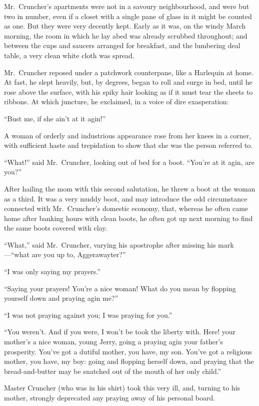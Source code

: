 Mr.\ Cruncher's apartments were not in a savoury neighbourhood, and
were but two in number, even if a closet with a single pane of glass
in it might be counted as one.  But they were very decently kept.
Early as it was, on the windy March morning, the room in which he lay
abed was already scrubbed throughout; and between the cups and
saucers arranged for breakfast, and the lumbering deal table, a very
clean white cloth was spread.

Mr.\ Cruncher reposed under a patchwork counterpane, like a Harlequin
at home.  At fast, he slept heavily, but, by degrees, began to roll
and surge in bed, until he rose above the surface, with his spiky
hair looking as if it must tear the sheets to ribbons.  At which
juncture, he exclaimed, in a voice of dire exasperation:

``Bust me, if she ain't at it agin!''

A woman of orderly and industrious appearance rose from her knees in
a corner, with sufficient haste and trepidation to show that she was
the person referred to.

``What!'' said Mr.\ Cruncher, looking out of bed for a boot.  ``You're at
it agin, are you?''

After hailing the mom with this second salutation, he threw a boot at
the woman as a third.  It was a very muddy boot, and may introduce
the odd circumstance connected with Mr.\ Cruncher's domestic economy,
that, whereas he often came home after banking hours with clean
boots, he often got up next morning to find the same boots
covered with clay.

``What,'' said Mr.\ Cruncher, varying his apostrophe after missing
his mark---``what are you up to, Aggerawayter?''

``I was only saying my prayers.''

``Saying your prayers!  You're a nice woman!  What do you mean by
flopping yourself down and praying agin me?''

``I was not praying against you; I was praying for you.''

``You weren't.  And if you were, I won't be took the liberty with.
Here! your mother's a nice woman, young Jerry, going a praying agin
your father's prosperity.  You've got a dutiful mother, you have, my
son.  You've got a religious mother, you have, my boy:  going and
flopping herself down, and praying that the bread-and-butter may be
snatched out of the mouth of her only child.''

Master Cruncher (who was in his shirt) took this very ill, and,
turning to his mother, strongly deprecated any praying away of his
personal board.

